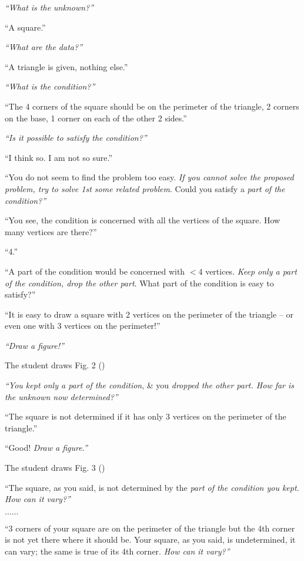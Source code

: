 \documentclass[oneside]{book}
\numberwithin{equation}{section}
\begin{document}
\textit{``What is the unknown?''}

``A square.''

\textit{``What are the data?''}

``A triangle is given, nothing else.''

\textit{``What is the condition?''}

``The 4 corners of the square should be on the perimeter of the triangle, 2 corners on the base, 1 corner on each of the other 2 sides.''

\textit{``Is it possible to satisfy the condition?''}

``I think so. I am not so sure.''

``You do not seem to find the problem too easy. \textit{If you cannot solve the proposed problem, try to solve 1st some related problem}. Could you satisfy a \textit{part of the condition?''}

``You see, the condition is concerned with all the vertices of the square. How many vertices are there?''

``4.''

``A part of the condition would be concerned with $< 4$ vertices. \textit{Keep only a part of the condition, drop the other part}. What part of the condition is easy to satisfy?''

``It is easy to draw a square with 2 vertices on the perimeter of the triangle -- or even one with 3 vertices on the perimeter!''

\textit{``Draw a figure!''}

The student draws Fig. 2 (\cite[p. 24]{Polya2014})

\textit{``You kept only a part of the condition}, \& you \textit{dropped the other part. How far is the unknown now determined?''}

``The square is not determined if it has only 3 vertices on the perimeter of the triangle.''

``Good! \textit{Draw a figure.''}

The student draws Fig. 3 (\cite[p. 24]{Polya2014})

``The square, as you said, is not determined by the \textit{part of the condition you kept. How can it vary?''}

$\ldots\ldots$

``3 corners of your square are on the perimeter of the triangle but the 4th corner is not yet there where it should be. Your square, as you said, is undetermined, it can vary; the same is true of its 4th corner. \textit{How can it vary?''}
\end{document}
